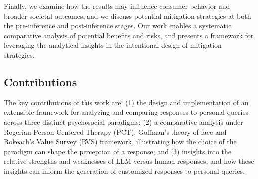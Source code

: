 Finally, we examine how the results may influence consumer behavior and broader societal outcomes, and we discuss potential mitigation strategies at both the pre-inference and post-inference stages. Our work enables a systematic comparative analysis of potential benefits and risks, and presents a framework for leveraging the analytical insights in the intentional design of mitigation strategies.






\subsection{Contributions}
The key contributions of this work are: (1) the design and implementation of an extensible framework for analyzing and comparing responses to personal queries across three distinct psychosocial paradigms; (2) a comparative analysis under Rogerian Person-Centered Therapy (PCT), Goffman’s theory of face and Rokeach’s Value Survey (RVS) framework, illustrating how the choice of the paradigm can shape the perception of a response; and (3) insights into the relative strengths and weaknesses of LLM versus human responses, and how these insights can inform the generation of customized responses to personal queries.

